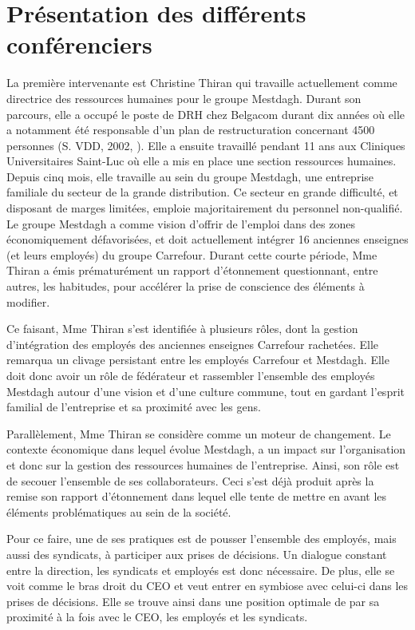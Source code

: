 \section{Présentation des différents conférenciers}
La première intervenante est Christine Thiran qui travaille actuellement comme directrice des ressources humaines pour le groupe Mestdagh. Durant son parcours, elle a occupé le poste de DRH chez Belgacom durant dix années où elle a notamment été responsable d'un plan de restructuration concernant 4500 personnes (S. VDD, 2002, \cite{planBEST}).
Elle a ensuite travaillé pendant 11 ans aux Cliniques Universitaires Saint-Luc où elle a mis en place une section ressources humaines.
Depuis cinq mois, elle travaille au sein du groupe Mestdagh, une entreprise familiale du secteur de la grande distribution. Ce secteur en grande difficulté, et disposant de marges limitées, emploie majoritairement du personnel non-qualifié. Le groupe Mestdagh a comme vision d'offrir de l'emploi dans des zones économiquement défavorisées, et doit actuellement intégrer 16 anciennes enseignes (et leurs employés) du groupe Carrefour.
Durant cette courte période, Mme Thiran a émis prématurément un rapport d'étonnement questionnant, entre autres, les habitudes, pour accélérer la prise de conscience des éléments à modifier. \newline

Ce faisant, Mme Thiran s'est identifiée à plusieurs rôles, dont la gestion d'intégration des employés des anciennes enseignes Carrefour rachetées. Elle remarqua un clivage persistant entre les employés Carrefour et Mestdagh. Elle doit donc avoir un rôle de fédérateur et rassembler l'ensemble des employés Mestdagh autour d'une vision et d'une culture commune, tout en gardant l'esprit familial de l'entreprise et sa proximité avec les gens.\newline

Parallèlement, Mme Thiran se considère comme un moteur de changement. Le contexte économique dans lequel évolue Mestdagh, a un impact sur l'organisation et donc sur la gestion des ressources humaines de l'entreprise. Ainsi, son rôle est de \og{}secouer\fg{} l'ensemble de ses collaborateurs. Ceci s'est déjà produit après la remise son rapport d'étonnement dans lequel elle tente de mettre en avant les éléments problématiques au sein de la société.\newline

Pour ce faire, une de ses pratiques est de pousser l'ensemble des employés, mais aussi des syndicats, à participer aux prises de décisions. Un dialogue constant entre la direction, les syndicats et employés est donc nécessaire. De plus, elle se voit comme le bras droit du CEO et veut entrer en symbiose avec celui-ci dans les prises de décisions. Elle se trouve ainsi dans une position optimale de par sa proximité à la fois avec le CEO, les employés et les syndicats.\newline

